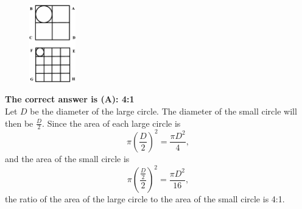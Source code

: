 \documentclass{article}
\begin{document}
\begin{figure}
	\includegraphics[width=20mm,viewport=66 28 464 700]{CCJPR74-20pic.eps}
\end{figure}

\textbf{The correct answer is (A): 4:1}\\[1 ex]
Let $D$ be the diameter of the large circle. The diameter of the small circle will then be $\frac{D}{2}$. Since the area of each large circle is
\begin{equation*}
\pi(\frac{D}{2})^2=\frac{\pi D^{2}}{4},
\end{equation*}
and the area of the small circle is
\begin{equation*}
\pi(\frac{\frac{D}{2}}{2})^2=\frac{\pi D^{2}}{16},
\end{equation*}
the ratio of the area of the large circle to the area of the small circle is 4:1.%
\end{document}
